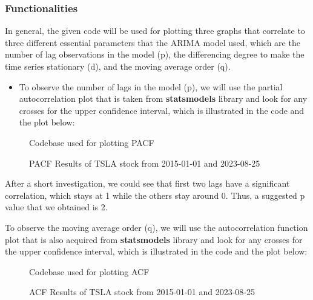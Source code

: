 \documentclass[11pt]{article}
\begin{document}
\subsubsection{Functionalities}
In general, the given code will be used for plotting three graphs that correlate to three different essential parameters that the ARIMA model used, which are the number of lag observations in the model (p), the differencing degree to make the time series stationary (d), and the moving average order (q).

\begin{itemize}
    \item To observe the number of lags in the model (p), we will use the partial autocorrelation plot that is taken from \textbf{statsmodels} library and look for any crosses for the upper confidence interval, which is illustrated in the code and the plot below:
\end{itemize}

\begin{figure}[ht]
    \centering
    \caption{Codebase used for plotting PACF}
    \label{fig:pacf_code}
\end{figure}

\begin{figure}[ht]
    \centering
    \caption{PACF Results of TSLA stock from 2015-01-01 and 2023-08-25}
    \label{fig:pacf_results}
\end{figure}

After a short investigation, we could see that first two lags have a significant correlation, which stays at 1 while the others stay around 0. Thus, a suggested p value that we obtained is 2.

To observe the moving average order (q), we will use the autocorrelation function plot that is also acquired from \textbf{statsmodels} library and look for any crosses for the upper confidence interval, which is illustrated in the code and the plot below:

\begin{figure}[ht]
    \centering
    \caption{Codebase used for plotting ACF}
    \label{fig:acf_code}
\end{figure}

\begin{figure}[ht]
    \centering
    \caption{ACF Results of TSLA stock from 2015-01-01 and 2023-08-25}
    \label{fig:acf_results}
\end{figure}
\end{document}
